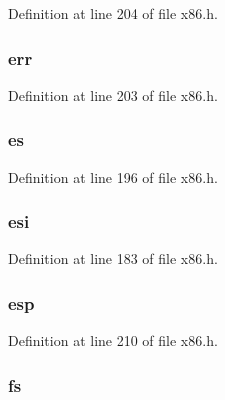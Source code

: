 Definition at line 204 of file x86.\-h.

\hypertarget{structtrapframe_a72c1299c81cb92b474caf193d7672dd8}{
\subsubsection[{err}]{ err}}\label{structtrapframe_a72c1299c81cb92b474caf193d7672dd8}


Definition at line 203 of file x86.\-h.

\hypertarget{structtrapframe_a926406c155a1238da40552b902622ab2}{
\subsubsection[{es}]{ es}}\label{structtrapframe_a926406c155a1238da40552b902622ab2}


Definition at line 196 of file x86.\-h.

\hypertarget{structtrapframe_ab40e0917bb6e7e462049fc4151201f0a}{
\subsubsection[{esi}]{ esi}}\label{structtrapframe_ab40e0917bb6e7e462049fc4151201f0a}


Definition at line 183 of file x86.\-h.

\hypertarget{structtrapframe_a4c294ae59a559d723bad6c161be04168}{
\subsubsection[{esp}]{ esp}}\label{structtrapframe_a4c294ae59a559d723bad6c161be04168}


Definition at line 210 of file x86.\-h.

\hypertarget{structtrapframe_a5f3d679db589770026f3d927f3fed7b7}{
\subsubsection[{fs}]{ fs}}\label{structtrapframe_a5f3d679db589770026f3d927f3fed7b7}


